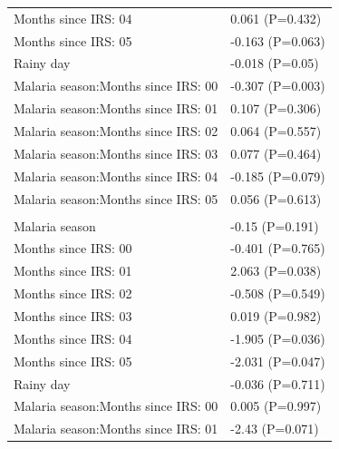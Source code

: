 \documentclass[]{article}
\begin{document}
\begin{longtable}[t]{ll}
\hspace{1em}Months since IRS: 04 & 0.061 (P=0.432)\\
\hspace{1em}Months since IRS: 05 & -0.163 (P=0.063)\\
\hspace{1em}Rainy day & -0.018 (P=0.05)\\
\hspace{1em}Malaria season:Months since IRS: 00 & -0.307 (P=0.003)\\
\hspace{1em}Malaria season:Months since IRS: 01 & 0.107 (P=0.306)\\
\hspace{1em}Malaria season:Months since IRS: 02 & 0.064 (P=0.557)\\
\hspace{1em}Malaria season:Months since IRS: 03 & 0.077 (P=0.464)\\
\hspace{1em}Malaria season:Months since IRS: 04 & -0.185 (P=0.079)\\
\hspace{1em}Malaria season:Months since IRS: 05 & 0.056 (P=0.613)\\
\addlinespace[1.5em]
\multicolumn{2}{l}{\textbf{Temporary not field worker}}\\
\hspace{1em}Malaria season & -0.15 (P=0.191)\\
\hspace{1em}Months since IRS: 00 & -0.401 (P=0.765)\\
\hspace{1em}Months since IRS: 01 & 2.063 (P=0.038)\\
\hspace{1em}Months since IRS: 02 & -0.508 (P=0.549)\\
\hspace{1em}Months since IRS: 03 & 0.019 (P=0.982)\\
\hspace{1em}Months since IRS: 04 & -1.905 (P=0.036)\\
\hspace{1em}Months since IRS: 05 & -2.031 (P=0.047)\\
\hspace{1em}Rainy day & -0.036 (P=0.711)\\
\hspace{1em}Malaria season:Months since IRS: 00 & 0.005 (P=0.997)\\
\hspace{1em}Malaria season:Months since IRS: 01 & -2.43 (P=0.071)\\

\end{longtable}
\end{document}
